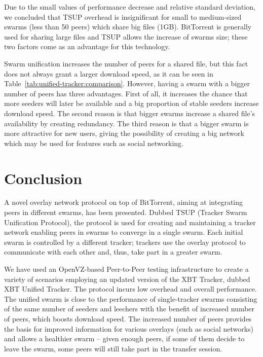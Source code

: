 Due to the small values of performance decrease and relative standard
deviation, we concluded that TSUP overhead is insignificant for small to
medium-sized swarms (less than 50 peers) which share big files (1GB).
BitTorrent is generally used for sharing large files and TSUP allows the
increase of swarms size; these two factors come as an advantage for this
technology.

Swarm unification increases the number of peers for a shared file, but this
fact does not always grant a larger download speed, as it can be seen in
Table~\ref{tab:unified-tracker:comparison}. However, having a swarm with a
bigger number of peers has three advantages. First of all, it increases the chance
that more seeders will later be available and a big proportion of stable
seeders increase download speed. The second reason is that bigger swarms
increase a shared file's availability by creating redundancy. The third reason
is
that a bigger swarm is more attractive for new users, giving the possibility
of creating a big network which may be used for features such as social
networking.

\section{Conclusion}
\label{sec:unified-tracker:conclusion}

A novel overlay network protocol on top of BitTorrent, aiming at integrating
peers in different swarms, has been presented. Dubbed TSUP (Tracker Swarm
Unification Protocol), the protocol is used for creating and maintaining a
tracker network enabling peers in swarms to converge in a single swarm. Each
initial swarm is controlled by a different tracker; trackers use the overlay
protocol to communicate with each other and, thus, take part in a greater
swarm.

We have used an OpenVZ-based Peer-to-Peer testing infrastructure to create a
variety of scenarios employing an updated version of the XBT Tracker, dubbed
XBT Unified Tracker. The protocol incurs low overhead and overall performance.
The unified swarm is close to the performance of single-tracker swarms
consisting of the same number of seeders and leechers with the benefit of
increased number of peers, which boosts download speed. The increased number of peers provides the basis
for improved information for various overlays (such as social networks) and
allows a healthier swarm -- given enough peers, if some of them decide to
leave the swarm, some peers will still take part in the transfer session.

